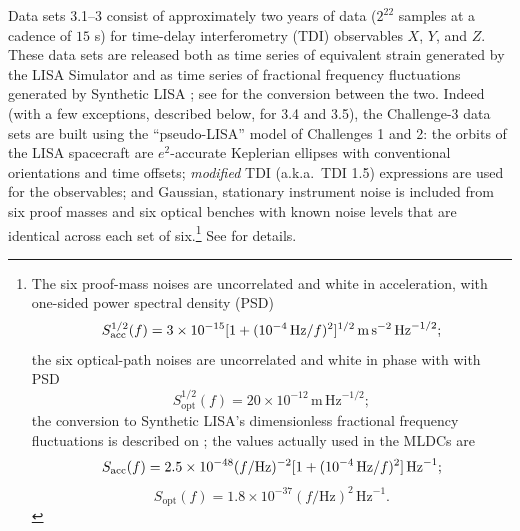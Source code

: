 \documentclass{iopart}
\begin{document}
Data sets 3.1--3 consist of approximately two years of data ($2^{22}$ samples at a cadence of $15$ s) for time-delay interferometry (TDI) observables $X$, $Y$, and $Z$. These data sets are released both as time series of equivalent strain generated by the LISA Simulator \cite{lisasimulator} and as time series of fractional frequency fluctuations generated by Synthetic LISA \cite{synthlisa}; see \cite[p.\ S556]{mldcgwdaw2} for the conversion between the two. Indeed (with a few exceptions, described below, for 3.4 and 3.5), the Challenge-3 data sets are built using the ``pseudo-LISA'' model of Challenges 1 and 2: the orbits of the LISA spacecraft are $e^2$-accurate Keplerian ellipses with conventional orientations and time offsets; \emph{modified} TDI (a.k.a.\ TDI 1.5) expressions are used for the observables; and Gaussian, stationary instrument noise is included from six proof masses and six optical benches with known noise levels that are identical across each set of six.\footnote{The six proof-mass noises are uncorrelated and white in acceleration, with one-sided power spectral density (PSD)
%
\begin{displaymath}
S_\mathrm{acc}^{1/2}(f) = 3 \times 10^{-15} [1 + (10^{-4}\,{\rm Hz}/f)^2]^{1/2} \, \mathrm{m}\, \mathrm{s}^{-2}\, \mathrm{Hz}^{-1/2};
\end{displaymath}
%
the six optical-path noises are uncorrelated and white in phase with with PSD
%
\begin{displaymath}
S_\mathrm{opt}^{1/2}(f) = 20 \times 10^{-12} \, \mathrm{m}\, \mathrm{Hz}^{-1/2};
\end{displaymath}
%
the conversion to Synthetic LISA's dimensionless fractional frequency fluctuations is described on \cite[p.\ 6]{synthlisa}; the values actually used in the MLDCs are
%
\begin{displaymath}
S_\mathrm{acc}(f) = 2.5 \times 10^{-48} (f/\mathrm{Hz})^{-2} [1 + (10^{-4}\,{\rm Hz}/f)^2] \, \mathrm{Hz}^{-1};
\end{displaymath}
\begin{displaymath}
S_\mathrm{opt}(f) = 1.8 \times 10^{-37} (f/\mathrm{Hz})^{2} \, \mathrm{Hz}^{-1}.
\end{displaymath}
} See \cite{mldcgwdaw2} for details.
\end{document}
